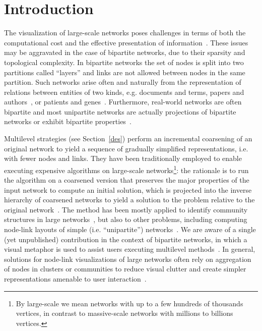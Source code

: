\documentclass[runningheads]{llncs}
\begin{document}
\section{Introduction}
The visualization of large-scale networks poses challenges in terms of both the computational cost and the effective presentation of information~\cite{tang,staudt}.
These issues may be aggravated in the case of bipartite networks,
due to their sparsity and topological complexity.
In bipartite networks the set of nodes is split into two partitions called ``layers''
and links are not allowed between nodes in the same partition.
Such networks arise often and naturally from the representation
of relations between entities of two kinds,
e.g. documents and terms, papers and authors~\cite{doc,sci,movie}, or patients and genes~\cite{gene}.
Furthermore, real-world networks are often bipartite and most unipartite networks are actually projections of bipartite networks or exhibit bipartite properties~\cite{guillaume0,guillaume}.

Multilevel strategies (see Section~\ref{des}) perform an incremental coarsening of an original
network to yield a sequence of gradually simplified representations, i.e. with fewer nodes and links.
They have been traditionally employed to enable executing expensive algorithms
on large-scale networks\footnote{By large-scale we mean networks with up to a few hundreds of thousands vertices, in contrast to massive-scale networks with  millions to billions vertices.}: the rationale is to run the algorithm on a coarsened
version that preserves the major properties of the input network to compute an initial solution, which is projected into the inverse hierarchy of coarsened networks  to yield a solution to the problem relative to the original network~\cite{alan2,ml2}. 
The method has been mostly applied to identify community structures in large networks~\cite{Pope2017}, but also to other problems, including computing node-link layouts of simple (i.e. ``unipartite'') networks~\cite{u1,u2,u3,u4,u5,u6,u7,u8,u9,u10}. We are aware of a single (yet unpublished) contribution in the context of bipartite networks, in which a visual metaphor is used to assist users executing multilevel methods~\cite{cintra2019}. In general, solutions for node-link visualizations of large networks often rely on aggregation of nodes in clusters or communities to reduce visual clutter and create simpler representations amenable to user interaction~\cite{a1,a2,a3,a4,a5,a6}. 
\end{document}
